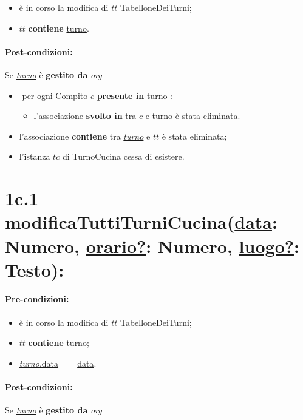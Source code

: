 \begin{itemize}
 \item è in corso la modifica di $tt$ \underline{TabelloneDeiTurni};
 \item $tt$ \textbf{contiene} \underline{turno}.
\end{itemize}

\paragraph{Post-condizioni:} Se \underline{\textit{turno}} è \textbf{gestito da} {\textit{org}}

\begin{itemize}
   \item \textlangle $ $ per ogni Compito $c$ \textbf{presente in} \underline{turno} \textrangle:
    \begin{itemize}
        \item l'associazione \textbf{svolto in} tra $c$ e \underline{turno} è stata eliminata.
    \end{itemize}
    \item l'associazione \textbf{contiene} tra \underline{\textit{turno}} e $tt$ è stata eliminata;
    \item l'istanza $tc$ di TurnoCucina cessa di esistere.
\end{itemize}

\section*{1c.1 modificaTuttiTurniCucina(\underline{data}: Numero, \underline{orario?}: Numero, \underline{luogo?}: Testo):}

\paragraph{Pre-condizioni:}

\begin{itemize}
 \item è in corso la modifica di $tt$ \underline{TabelloneDeiTurni};
 \item $tt$ \textbf{contiene} \underline{turno};
 \item \underline{\textit{turno}.data} == \underline{data}.
\end{itemize}

\paragraph{Post-condizioni:} Se \underline{\textit{turno}} è \textbf{gestito da} {\textit{org}}

